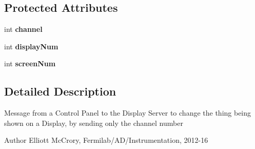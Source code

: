 \subsection*{Protected Attributes}
\begin{DoxyCompactItemize}
\item 
\hypertarget{classgov_1_1fnal_1_1ppd_1_1dd_1_1chat_1_1xml_1_1ChangeChannelByNumber_aa240338d47f7135f8cf1221ff0e95049}{int {\bfseries channel}}\label{classgov_1_1fnal_1_1ppd_1_1dd_1_1chat_1_1xml_1_1ChangeChannelByNumber_aa240338d47f7135f8cf1221ff0e95049}

\item 
\hypertarget{classgov_1_1fnal_1_1ppd_1_1dd_1_1chat_1_1xml_1_1ChangeChannelByNumber_ac25565ae4c069a33eac1a1171098968b}{int {\bfseries display\-Num}}\label{classgov_1_1fnal_1_1ppd_1_1dd_1_1chat_1_1xml_1_1ChangeChannelByNumber_ac25565ae4c069a33eac1a1171098968b}

\item 
\hypertarget{classgov_1_1fnal_1_1ppd_1_1dd_1_1chat_1_1xml_1_1ChangeChannelByNumber_a7dc85528a7eab4738396b9c29db5bb2f}{int {\bfseries screen\-Num}}\label{classgov_1_1fnal_1_1ppd_1_1dd_1_1chat_1_1xml_1_1ChangeChannelByNumber_a7dc85528a7eab4738396b9c29db5bb2f}

\end{DoxyCompactItemize}


\subsection{Detailed Description}
Message from a Control Panel to the Display Server to change the thing being shown on a Display, by sending only the channel number

\begin{DoxyAuthor}{Author}
Elliott Mc\-Crory, Fermilab/\-A\-D/\-Instrumentation, 2012-\/16 
\end{DoxyAuthor}


